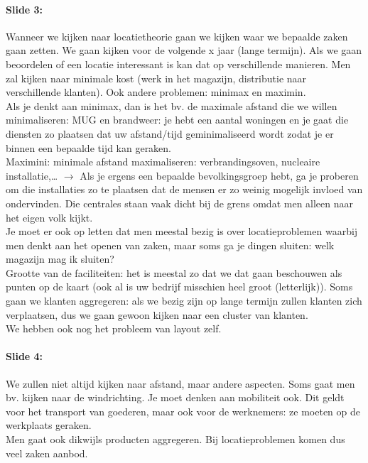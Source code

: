 \documentclass[10pt,a4paper]{report}
\begin{document}
\paragraph{Slide 3:} Wanneer we kijken naar locatietheorie gaan we kijken waar we bepaalde zaken gaan zetten. We gaan kijken voor de volgende x jaar (lange termijn). Als we gaan beoordelen of een locatie interessant is kan dat op verschillende manieren. Men zal kijken naar minimale kost (werk in het magazijn, distributie naar verschillende klanten). Ook andere problemen: minimax en maximin.\\
Als je denkt aan minimax, dan is het bv. de maximale afstand die we willen minimaliseren: MUG en brandweer: je hebt een aantal woningen en je gaat die diensten zo plaatsen dat uw afstand/tijd geminimaliseerd wordt zodat je er binnen een bepaalde tijd kan geraken.\\
Maximini: minimale afstand maximaliseren: verbrandingsoven, nucleaire installatie,… $\rightarrow$ Als je ergens een bepaalde bevolkingsgroep hebt, ga je proberen om die installaties zo te plaatsen dat de mensen er zo weinig mogelijk invloed van ondervinden. Die centrales staan vaak dicht bij de grens omdat men alleen naar het eigen volk kijkt. \\
Je moet er ook op letten dat men meestal bezig is over locatieproblemen waarbij men denkt aan het openen van zaken, maar soms ga je dingen sluiten: welk magazijn mag ik sluiten?\\
Grootte van de faciliteiten: het is meestal zo dat we dat gaan beschouwen als punten op de kaart (ook al is uw bedrijf misschien heel groot (letterlijk)). Soms gaan we klanten aggregeren: als we bezig zijn op lange termijn zullen klanten zich verplaatsen, dus we gaan gewoon kijken naar een cluster van klanten.\\
We hebben ook nog het probleem van layout zelf.

\paragraph{Slide 4:} We zullen niet altijd kijken naar afstand, maar andere aspecten. Soms gaat men bv. kijken naar de windrichting. Je moet denken aan mobiliteit ook. Dit geldt voor het transport van goederen, maar ook voor de werknemers: ze moeten op de werkplaats geraken.\\ Men gaat ook dikwijls producten aggregeren.
Bij locatieproblemen komen dus veel zaken aanbod.
\end{document}
